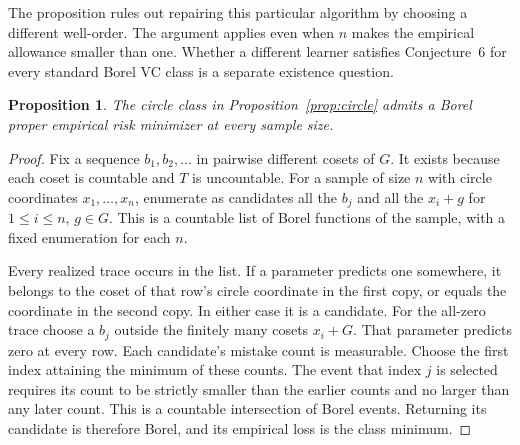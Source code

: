\documentclass[11pt]{article}
\newtheorem{proposition}[theorem]{Proposition}
\theoremstyle{definition}\newtheorem{definition}[theorem]{Definition}
\begin{document}
The proposition rules out repairing this particular algorithm by choosing
a different well-order. The argument applies even when $n$ makes the empirical allowance
smaller than one. Whether a different learner satisfies Conjecture~6 for
every standard Borel VC class is a separate existence question.

\begin{proposition}\label{prop:circle-ordinary}
The circle class in Proposition~\ref{prop:circle} admits a Borel proper
empirical risk minimizer at every sample size.
\end{proposition}
\begin{proof}
Fix a sequence $b_1,b_2,\ldots$ in pairwise different cosets of $G$.
It exists because each coset is countable and $T$ is uncountable.
For a sample of size $n$ with circle coordinates $x_1,\ldots,x_n$, enumerate
as candidates all the $b_j$ and all the $x_i+g$ for $1\le i\le n$, $g\in G$.
This is a countable list of Borel functions of the sample, with a fixed
enumeration for each $n$.

Every realized trace occurs in the list. If a parameter predicts one
somewhere, it belongs to the coset of that row's circle coordinate in
the first copy, or equals the coordinate in the second copy. In either
case it is a candidate. For the all-zero trace choose a $b_j$ outside the
finitely many cosets $x_i+G$. That parameter predicts zero at every row.
Each candidate's mistake count is measurable. Choose the first index
attaining the minimum of these counts. The event that index $j$ is selected
requires its count to be strictly smaller than the earlier counts and no
larger than any later count. This is a countable intersection of Borel
events. Returning its candidate is therefore Borel, and its empirical
loss is the class minimum.
\end{proof}
\end{document}
